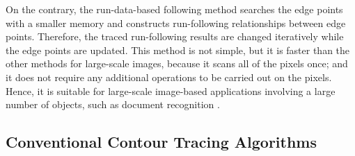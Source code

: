 \documentclass[sensors,article,accept,moreauthors,pdftex,10pt,a4paper]{mdpi}
\newcommand{\JHMEMO}[1]{\textcolor{red}{#1}}
\begin{document}



On the contrary, the run-data-based following method searches the edge points with a smaller memory and constructs run-following relationships between edge points. Therefore, the traced run-following results are changed iteratively while the edge points are updated. This method is not simple, but it is faster than the other methods for large-scale images, because it scans all of the pixels once; and it does not require any additional operations to be carried out on the pixels. Hence, it is suitable for large-scale image-based applications involving a large number of objects, such as document recognition \cite{Miyatake1997Contour}.

\subsection{Conventional Contour Tracing Algorithms}
\end{document}

